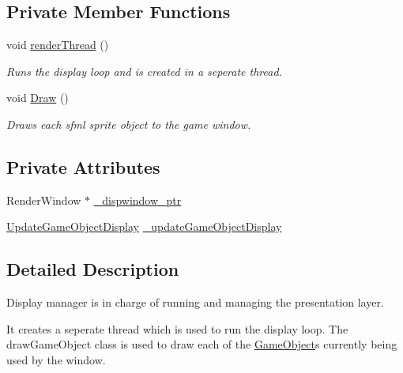 \subsection*{Private Member Functions}
\begin{DoxyCompactItemize}
\item 
\mbox{\label{class_display_manager_a79b7a390f3a2a09e7209d271e589e705}} 
void \hyperlink{class_display_manager_a79b7a390f3a2a09e7209d271e589e705}{render\+Thread} ()
\begin{DoxyCompactList}\small\item\em Runs the display loop and is created in a seperate thread. \end{DoxyCompactList}\item 
\mbox{\label{class_display_manager_a59cef8980a225ca13757e362a92891d1}} 
void \hyperlink{class_display_manager_a59cef8980a225ca13757e362a92891d1}{Draw} ()
\begin{DoxyCompactList}\small\item\em Draws each sfml sprite object to the game window. \end{DoxyCompactList}\end{DoxyCompactItemize}
\subsection*{Private Attributes}
\begin{DoxyCompactItemize}
\item 
Render\+Window $\ast$ \hyperlink{class_display_manager_abe0369d0fa6b544c77d9d50d50f949cf}{\+\_\+dispwindow\+\_\+ptr}
\item 
\hyperlink{class_update_game_object_display}{Update\+Game\+Object\+Display} \hyperlink{class_display_manager_aee260bf088ffc55e21bd1ef282a139db}{\+\_\+update\+Game\+Object\+Display}
\end{DoxyCompactItemize}


\subsection{Detailed Description}
Display manager is in charge of running and managing the presentation layer. 

It creates a seperate thread which is used to run the display loop. The draw\+Game\+Object class is used to draw each of the \hyperlink{class_game_object}{Game\+Object}\textquotesingle{}s currently being used by the window. 

